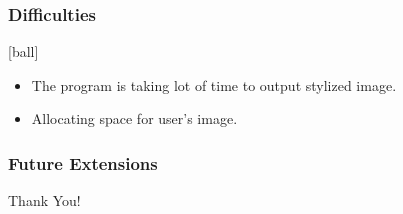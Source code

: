 \documentclass[14pt]{beamer}
\begin{document}
\begin{frame}
		\frametitle{Difficulties}
        \begin{itemize}

				\item The program is taking lot of time to output stylized image.
                \item Allocating space for user's image.
		\end{itemize}
\end{frame}

\begin{frame}
    \frametitle{Future Extensions}

\end{frame}

\begin{frame}
    \begin{center}  
       \Huge Thank You!
    \end{center}
\end{frame}
\end{document}
